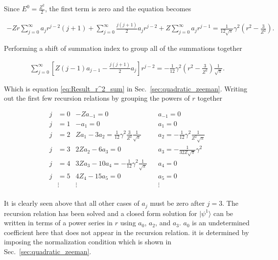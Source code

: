     \noindent Since $E^0 = \frac{Z^2}{2}$, the first term is zero and the equation becomes 

    \begin{align*}
        -Zr \sum_{j = 0}^\infty a_j r^{j - 2} (j + 1) + \sum_{j = 0}^\infty \frac{j(j+1)}{2} a_j r^{j - 2} + Z \sum_{j = 0}^\infty a_j r^{j-1} = \frac{1}{12\sqrt{\pi}} \gamma^2 \left(r^2 - \frac{3}{Z^2} \right).
    \end{align*}

    \noindent Performing a shift of summation index to group all of the summations together 

    \begin{align}
        \sum_{j = 0}^\infty \left[ Z(j-1) a_{j-1} - \frac{j(j+1)}{2} a_j \right] r^{j-2} = -\frac{1}{12} \gamma^2 \left(r^2 - \frac{3}{Z^2} \right) \frac{1}{\sqrt{\pi}}.
    \end{align}

    \noindent Which is equation \eqref{eq:Result_r^2_sum} in Sec.~\ref{sec:quadratic_zeeman}. Writing out the first few recursion relations by grouping the powers of $r$ together 

    \begin{align*}
        j &= 0 & -Za_{-1} = 0& &a_{-1} = 0\\ \nonumber
        j &= 1 & -a_1 = 0& &a_{1} = 0\\ \nonumber
        j &= 2 & Za_1 - 3a_2 = \frac{1}{12} \gamma^2 \frac{3}{Z^2}\frac{1}{\sqrt{\pi}} & &a_2 = -\frac{1}{12} \gamma^2 \frac{1}{Z^2 \sqrt{\pi}}\\ \nonumber
        j &= 3 & 2Za_2 - 6a_3 = 0&& a_3 = -\frac{1}{32Z\sqrt{\pi}} \gamma^2\\ \nonumber
        j &= 4 & 3Za_3 - 10a_4 = -\frac{1}{12} \gamma^2 \frac{1}{\sqrt{\pi}} && a_4 = 0\\ \nonumber
        j &= 5 & 4Z_4 - 15a_5 = 0 && a_5 = 0 \\ \nonumber
        & \vdots & \vdots && \vdots \\
    \end{align*}

    \noindent It is clearly seen above that all other cases of $a_j$ must be zero after $j = 3$. The recursion relation has been solved and a closed form solution for $\vert \psi^1 \rangle$ can be written in terms of a power series in $r$ using $a_0$, $a_2$, and $a_3$. $a_0$ is an undetermined coefficient here that does not appear in the recursion relation. it is determined by imposing the normalization condition which is shown in Sec.~\ref{sec:quadratic_zeeman}.\\


